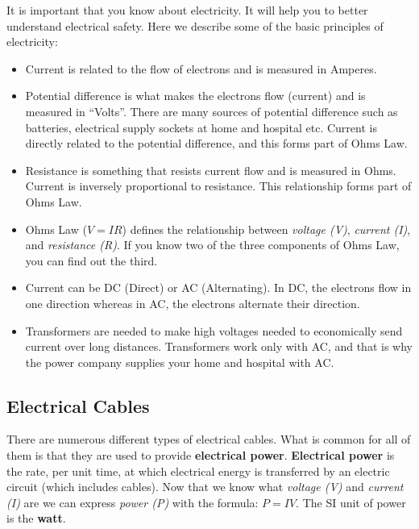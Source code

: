 \documentclass[14pt,twocolumn]{extarticle} %
\begin{document}
It is important that you know about electricity. It will help you to better understand electrical safety. Here we describe some of the basic principles of electricity:

\begin{itemize}

\item Current is related to the flow of electrons and is measured in Amperes.

\item Potential difference is what makes the electrons flow (current) and is measured in “Volts”. There are many sources of potential difference such as batteries, electrical supply sockets at home and hospital etc. Current is directly related to the potential difference, and this forms part of Ohms Law.

\item Resistance is something that resists current flow and is measured in Ohms. Current is inversely proportional to resistance. This relationship forms part of Ohms Law.

\item Ohms Law (\textbf{$V = I R$}) defines the relationship between \textit{voltage (V)}, \textit{current (I)}, and \textit{resistance (R)}. If you know two of the three components of Ohms Law, you can find out the third.

\item Current can be DC (Direct) or AC (Alternating). In DC, the electrons flow in one direction whereas in AC, the electrons alternate their direction.

\item Transformers are needed to make high voltages needed to economically send current over long distances. Transformers work only with AC, and that is why the power company supplies your home and hospital with AC.

\end{itemize}

\subsection{Electrical Cables}
\label{electrical-cables}
There are numerous different types of electrical cables. What is common for all of them is that they are used to provide \textbf{electrical power}. \textbf{Electrical power} is the rate, per unit time, at which electrical energy is transferred by an electric circuit (which includes cables). Now that we know what \textit{voltage (V)} and \textit{current (I)} are we can express \textit{power (P)} with the formula: \textbf{$P = I V$}. The SI unit of power is the \textbf{watt}. 
\end{document}
